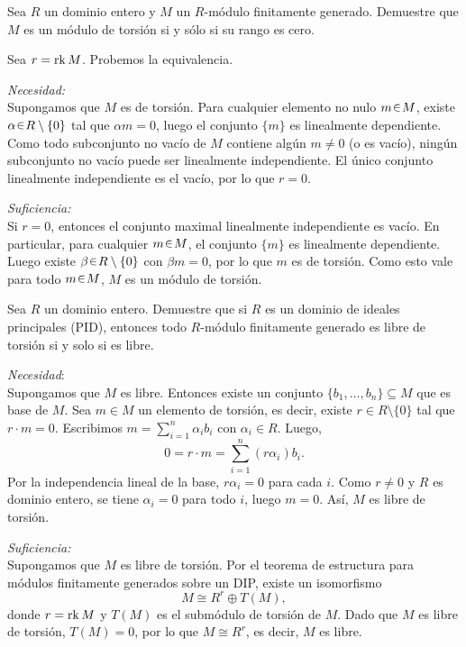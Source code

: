\begin{ejer}
Sea $R$ un dominio entero y $M$ un $R$-módulo finitamente generado. Demuestre que $M$ es un módulo de torsión si y sólo si su rango es cero.
\end{ejer}
\begin{sol}
Sea $r = \operatorname{rk} M$. Probemos la equivalencia.

\emph{Necesidad:}\\ Supongamos que $M$ es de torsión. Para cualquier elemento no nulo $m \en M$, existe $\alpha \en R \setminus \{0\}$ tal que $\alpha m = 0$, luego el conjunto $\{m\}$ es linealmente dependiente. Como todo subconjunto no vacío de $M$ contiene algún $m \neq 0$ (o es vacío), ningún subconjunto no vacío puede ser linealmente independiente. El único conjunto linealmente independiente es el vacío, por lo que $r = 0$.

\emph{Suficiencia:}\\ Si $r = 0$, entonces el conjunto maximal linealmente independiente es vacío. En particular, para cualquier $m \en M$, el conjunto $\{m\}$ es linealmente dependiente. Luego existe $\beta \en R \setminus \{0\}$ con $\beta m = 0$, por lo que $m$ es de torsión. Como esto vale para todo $m \en M$, $M$ es un módulo de torsión.
\end{sol}

\begin{ejer}
Sea $R$ un dominio entero. Demuestre que si $R$ es un dominio de ideales principales (PID), entonces todo $R$-módulo finitamente generado es libre de torsión si y solo si es libre.
\end{ejer}
\begin{sol}
\emph{Necesidad}:\\
Supongamos que $M$ es libre. Entonces existe un conjunto $\{b_1, \dots, b_n\} \subseteq M$ que es base de $M$. Sea $m \in M$ un elemento de torsión, es decir, existe $r \in R \setminus \{0\}$ tal que $r \cdot m = 0$. Escribimos $m = \sum_{i=1}^n \alpha_i b_i$ con $\alpha_i \in R$. Luego,
\[
0 = r \cdot m = \sum_{i=1}^n (r \alpha_i) b_i.
\]
Por la independencia lineal de la base, $r \alpha_i = 0$ para cada $i$. Como $r \neq 0$ y $R$ es dominio entero, se tiene $\alpha_i = 0$ para todo $i$, luego $m = 0$. Así, $M$ es libre de torsión.

\emph{Suficiencia:}\\
Supongamos que $M$ es libre de torsión. Por el teorema de estructura para módulos finitamente generados sobre un DIP, existe un isomorfismo
\[
M \cong R^r \oplus T(M),
\]
donde $r = \operatorname{rk} M$ y $T(M)$ es el submódulo de torsión de $M$. Dado que $M$ es libre de torsión, $T(M) = 0$, por lo que $M \cong R^r$, es decir, $M$ es libre.
\end{sol}

